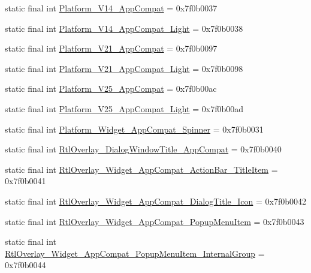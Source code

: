 \begin{CompactItemize}
\item 
static final int \hyperlink{classandroid_1_1support_1_1v7_1_1palette_1_1_r_1_1style_5ee8a2df418e68b3db58fe52b8508984}{Platform\_\-V14\_\-AppCompat} = 0x7f0b0037
\item 
static final int \hyperlink{classandroid_1_1support_1_1v7_1_1palette_1_1_r_1_1style_9ce448f82197155b39cca9a9584d0cdb}{Platform\_\-V14\_\-AppCompat\_\-Light} = 0x7f0b0038
\item 
static final int \hyperlink{classandroid_1_1support_1_1v7_1_1palette_1_1_r_1_1style_8b0d751499c7e9dcd70c74f8a9bde531}{Platform\_\-V21\_\-AppCompat} = 0x7f0b0097
\item 
static final int \hyperlink{classandroid_1_1support_1_1v7_1_1palette_1_1_r_1_1style_6e9e40119c701f1abf404041123144dc}{Platform\_\-V21\_\-AppCompat\_\-Light} = 0x7f0b0098
\item 
static final int \hyperlink{classandroid_1_1support_1_1v7_1_1palette_1_1_r_1_1style_fac80cdcde1e8dae8a2e1e7b76b3e7dc}{Platform\_\-V25\_\-AppCompat} = 0x7f0b00ac
\item 
static final int \hyperlink{classandroid_1_1support_1_1v7_1_1palette_1_1_r_1_1style_8a77b221f49b075a71c4f5ff1ab0ca02}{Platform\_\-V25\_\-AppCompat\_\-Light} = 0x7f0b00ad
\item 
static final int \hyperlink{classandroid_1_1support_1_1v7_1_1palette_1_1_r_1_1style_bb40ddc7ae94a62a9e3d422ee4b7f08d}{Platform\_\-Widget\_\-AppCompat\_\-Spinner} = 0x7f0b0031
\item 
static final int \hyperlink{classandroid_1_1support_1_1v7_1_1palette_1_1_r_1_1style_f12bda34959c17bbfe0cf0439f49369c}{RtlOverlay\_\-DialogWindowTitle\_\-AppCompat} = 0x7f0b0040
\item 
static final int \hyperlink{classandroid_1_1support_1_1v7_1_1palette_1_1_r_1_1style_b835582c598da7efc803ca896c0d4642}{RtlOverlay\_\-Widget\_\-AppCompat\_\-ActionBar\_\-TitleItem} = 0x7f0b0041
\item 
static final int \hyperlink{classandroid_1_1support_1_1v7_1_1palette_1_1_r_1_1style_d92ed079b7c7b4eb9de4ef9e28d3f91f}{RtlOverlay\_\-Widget\_\-AppCompat\_\-DialogTitle\_\-Icon} = 0x7f0b0042
\item 
static final int \hyperlink{classandroid_1_1support_1_1v7_1_1palette_1_1_r_1_1style_cf4e3f8b57cfc3213d0c0951dfc3d894}{RtlOverlay\_\-Widget\_\-AppCompat\_\-PopupMenuItem} = 0x7f0b0043
\item 
static final int \hyperlink{classandroid_1_1support_1_1v7_1_1palette_1_1_r_1_1style_6c04b1b0f4da7765d01ff7e2a6048e51}{RtlOverlay\_\-Widget\_\-AppCompat\_\-PopupMenuItem\_\-InternalGroup} = 0x7f0b0044

\end{CompactItemize}
